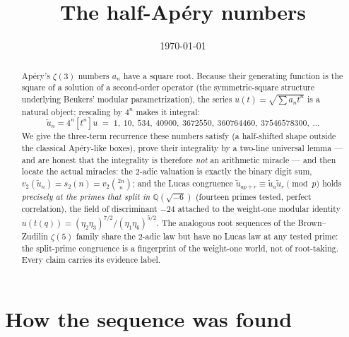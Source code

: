 \documentclass[11pt,reqno]{amsart}
\theoremstyle{plain}
\theoremstyle{definition}
\theoremstyle{remark}
\newcommand{\Q}{\mathbb{Q}}
\newcommand{\bin}[2]{\binom{#1}{#2}}
\newcommand{\ut}{\tilde u}
\begin{document}
\title{The half-Ap\'ery numbers}

\author{}
\date{\today}

\begin{abstract}
Ap\'ery's $\zeta(3)$ numbers $a_n$ have a square root. Because their
generating function is the square of a solution of a second-order operator
(the symmetric-square structure underlying Beukers' modular
parametrization), the series $u(t)=\sqrt{\sum a_nt^n}$ is a natural object;
rescaling by $4^n$ makes it integral:
\[
\ut_n = 4^n[t^n]u \;=\; 1,\ 10,\ 534,\ 40900,\ 3672550,\ 360764460,\
37546578300,\ \dots
\]
We give the three-term recurrence these numbers satisfy (a half-shifted
shape outside the classical Ap\'ery-like boxes), prove their integrality by
a two-line universal lemma --- and are honest that the integrality is
therefore \emph{not} an arithmetic miracle --- and then locate the actual
miracles: the $2$-adic valuation is exactly the binary digit sum,
$v_2(\ut_n)=s_2(n)=v_2\bin{2n}{n}$; and the Lucas congruence
$\ut_{ap+r}\equiv\ut_a\ut_r\pmod p$ holds \emph{precisely at the primes
that split in $\Q(\sqrt{-6})$} (fourteen primes tested, perfect
correlation), the field of discriminant $-24$ attached to the weight-one
modular identity $u(t(q))=(\eta_2\eta_3)^{7/2}/(\eta_1\eta_6)^{5/2}$. The
analogous root sequences of the Brown--Zudilin $\zeta(5)$ family share the
$2$-adic law but have no Lucas law at any tested prime: the split-prime
congruence is a fingerprint of the weight-one world, not of root-taking.
Every claim carries its evidence label.
\end{abstract}

\maketitle

\section{How the sequence was found}
\end{document}
